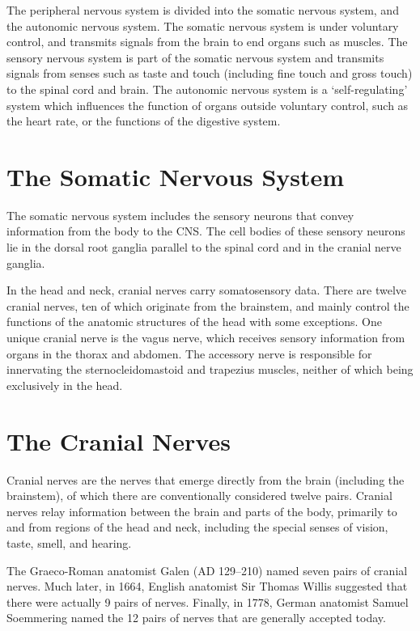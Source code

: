The peripheral nervous system is divided into the somatic nervous system, and the autonomic nervous system. The somatic nervous system is under voluntary control, and transmits signals from the brain to end organs such as muscles. The sensory nervous system is part of the somatic nervous system and transmits signals from senses such as taste and touch (including fine touch and gross touch) to the spinal cord and brain. The autonomic nervous system is a `self-regulating' system which influences the function of organs outside voluntary control, such as the heart rate, or the functions of the digestive system.

\hypertarget{the-somatic-nervous-system}{%
\section{The Somatic Nervous System}\label{the-somatic-nervous-system}}

The somatic nervous system includes the sensory neurons that convey information from the body to the CNS. The cell bodies of these sensory neurons lie in the dorsal root ganglia parallel to the spinal cord and in the cranial nerve ganglia.

In the head and neck, cranial nerves carry somatosensory data. There are twelve cranial nerves, ten of which originate from the brainstem, and mainly control the functions of the anatomic structures of the head with some exceptions. One unique cranial nerve is the vagus nerve, which receives sensory information from organs in the thorax and abdomen. The accessory nerve is responsible for innervating the sternocleidomastoid and trapezius muscles, neither of which being exclusively in the head.

\hypertarget{the-cranial-nerves}{%
\section{The Cranial Nerves}\label{the-cranial-nerves}}

Cranial nerves are the nerves that emerge directly from the brain (including the brainstem), of which there are conventionally considered twelve pairs. Cranial nerves relay information between the brain and parts of the body, primarily to and from regions of the head and neck, including the special senses of vision, taste, smell, and hearing.

The Graeco-Roman anatomist Galen (AD 129--210) named seven pairs of cranial nerves. Much later, in 1664, English anatomist Sir Thomas Willis suggested that there were actually 9 pairs of nerves. Finally, in 1778, German anatomist Samuel Soemmering named the 12 pairs of nerves that are generally accepted today.

